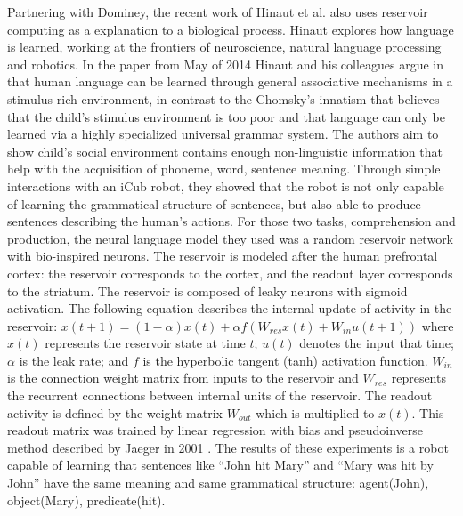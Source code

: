 \documentclass[12pt,oneside]{CUNY_CS_PhD}
\begin{document}
Partnering with Dominey, the recent work of Hinaut et al. \cite{hinaut_2012, hinaut_exploring_2014} also uses reservoir computing as a explanation to a biological process. Hinaut explores how language is learned, working at the frontiers of neuroscience, natural language processing and robotics. In the paper from May of 2014 \cite{hinaut_exploring_2014} Hinaut and his colleagues argue in that human language can be learned through general associative mechanisms in a stimulus rich environment, in contrast to the Chomsky's innatism that believes that the child's stimulus environment is too poor and that language can only be learned via a highly specialized universal grammar system.  The authors aim to show child's social environment contains enough non-linguistic information that help with the acquisition of phoneme, word, sentence meaning. Through simple interactions with an iCub robot, they showed that the robot is not only capable of learning the grammatical structure of sentences, but also able to produce sentences describing the human's actions. For those two tasks, comprehension and production, the neural language model they used was a random reservoir network with bio-inspired neurons. The reservoir is modeled after the human prefrontal cortex: the reservoir corresponds to the cortex, and the readout layer corresponds to the striatum. The reservoir is composed of leaky neurons with sigmoid activation. The following equation describes the internal update of activity in the reservoir: $x(t + 1) = (1 − \alpha)x(t) + \alpha f (W_{res}x(t ) + W_{in}u(t + 1))$ where $x(t)$ represents the reservoir state at time $t$; $u(t)$ denotes the input that time;$\alpha$ is the leak rate; and $f$ is the hyperbolic tangent (tanh) activation function. $W_{in}$ is the connection weight matrix from inputs to the reservoir and $W_{res}$ represents the recurrent connections between internal units of the reservoir. The readout activity is defined by the weight matrix $W_{out}$ which is multiplied to $x(t)$. This readout matrix was trained by linear regression with bias and pseudoinverse method described by Jaeger in 2001 \cite{jaeger_echo_2001}. The results of these experiments is a robot capable of learning that sentences like ``John hit Mary'' and ``Mary was hit by John'' have the same meaning and same grammatical structure: agent(John), object(Mary), predicate(hit).
\end{document}
